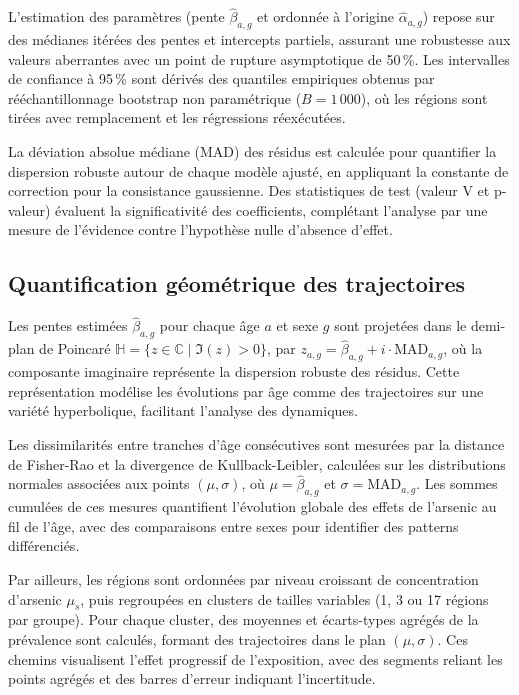 L'estimation des paramètres (pente $\hat{\beta}_{a,g}$ et ordonnée à l'origine $\hat{\alpha}_{a,g}$) repose sur des médianes itérées des pentes et intercepts partiels, assurant une robustesse aux valeurs aberrantes avec un point de rupture asymptotique de 50\,\%. Les intervalles de confiance à 95\,\% sont dérivés des quantiles empiriques obtenus par rééchantillonnage bootstrap non paramétrique ($B = 1\,000$), où les régions sont tirées avec remplacement et les régressions réexécutées.

La déviation absolue médiane (MAD) des résidus est calculée pour quantifier la dispersion robuste autour de chaque modèle ajusté, en appliquant la constante de correction pour la consistance gaussienne. Des statistiques de test (valeur V et p-valeur) évaluent la significativité des coefficients, complétant l'analyse par une mesure de l'évidence contre l'hypothèse nulle d'absence d'effet.

\subsection{Quantification géométrique des trajectoires}
Les pentes estimées $\hat{\beta}_{a,g}$ pour chaque âge $a$ et sexe $g$ sont projetées dans le demi-plan de Poincaré $\mathbb{H} = \{ z \in \mathbb{C} \mid \Im(z) > 0 \}$, par $z_{a,g} = \hat{\beta}_{a,g} + i \cdot \mathrm{MAD}_{a,g}$, où la composante imaginaire représente la dispersion robuste des résidus. Cette représentation modélise les évolutions par âge comme des trajectoires sur une variété hyperbolique, facilitant l'analyse des dynamiques.

Les dissimilarités entre tranches d'âge consécutives sont mesurées par la distance de Fisher-Rao et la divergence de Kullback-Leibler, calculées sur les distributions normales associées aux points $(\mu, \sigma)$, où $\mu = \hat{\beta}_{a,g}$ et $\sigma = \mathrm{MAD}_{a,g}$. Les sommes cumulées de ces mesures quantifient l'évolution globale des effets de l'arsenic au fil de l'âge, avec des comparaisons entre sexes pour identifier des patterns différenciés.

Par ailleurs, les régions sont ordonnées par niveau croissant de concentration d'arsenic $\mu_s$, puis regroupées en clusters de tailles variables (1, 3 ou 17 régions par groupe). Pour chaque cluster, des moyennes et écarts-types agrégés de la prévalence sont calculés, formant des trajectoires dans le plan $(\mu, \sigma)$. Ces chemins visualisent l'effet progressif de l'exposition, avec des segments reliant les points agrégés et des barres d'erreur indiquant l'incertitude.
